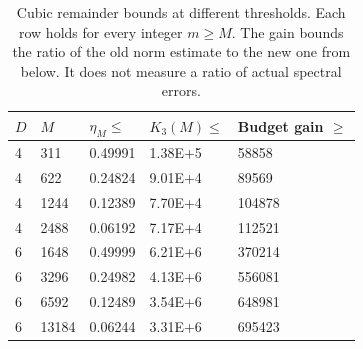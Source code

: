 \begin{table}[htbp]
\centering
\caption{Cubic remainder bounds at different thresholds. Each row holds for every integer $m\geq M$. The gain bounds the ratio of the old norm estimate to the new one from below. It does not measure a ratio of actual spectral errors.}
\label{tab:cubic_anchor}
\begin{tabular}{lllll}
\toprule
$D$ & $M$ & $\eta_M\leq$ & $K_3(M)\leq$ & Budget gain $\geq$ \\
\midrule
4 & 311 & 0.49991 & 1.38E+5 & 58858 \\
4 & 622 & 0.24824 & 9.01E+4 & 89569 \\
4 & 1244 & 0.12389 & 7.70E+4 & 104878 \\
4 & 2488 & 0.06192 & 7.17E+4 & 112521 \\
6 & 1648 & 0.49999 & 6.21E+6 & 370214 \\
6 & 3296 & 0.24982 & 4.13E+6 & 556081 \\
6 & 6592 & 0.12489 & 3.54E+6 & 648981 \\
6 & 13184 & 0.06244 & 3.31E+6 & 695423 \\
\bottomrule
\end{tabular}
\end{table}
